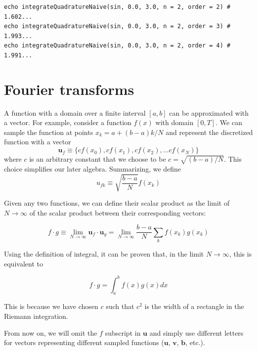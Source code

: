 \documentclass[justified, sixbynine]{tufte-book}
\theoremstyle{plain}%
\newtheorem * {corollary}{Corollary}
\theoremstyle{definition}
\theoremstyle{remark}
\newtheorem * {remark}{Remark}
\newtheorem * {note}{Note}
\begin{document}
\begin{fullwidth}
\begin{lstlisting}
echo integrateQuadratureNaive(sin, 0.0, 3.0, n = 2, order = 2) # 1.602...
echo integrateQuadratureNaive(sin, 0.0, 3.0, n = 2, order = 3) # 1.993...
echo integrateQuadratureNaive(sin, 0.0, 3.0, n = 2, order = 4) # 1.991...
\end{lstlisting}

\newpage
\section{Fourier transforms}

A function with a domain over a finite interval $[a, b]$ can be approximated with a vector. For example, consider a function $f(x)$ with domain $[0, T]$. We can sample the function at points $x_k = a+(b-a)k/N$ and represent the discretized function with a vector
\begin{equation}
\mathbf{u}_f \equiv \{cf(x_0), cf(x_1), cf(x_2), ... cf(x_N)\}
\end{equation}
where $c$ is an arbitrary constant that we choose to be $c=\sqrt{(b-a)/N}$. This choice simplifies our later algebra.
Summarizing, we define
\begin{equation}
u_{fk} \equiv \sqrt{\frac{b-a}{N}}f(x_k)
\end{equation}

Given any two functions, we can define their scalar product as the limit of $N\rightarrow\infty$ of the scalar product between their corresponding vectors:

\begin{equation}
f \cdot g \equiv \lim_{N\rightarrow\infty} \mathbf{u}_f \cdot \mathbf{u}_g =
\lim_{N\rightarrow\infty} \frac{b-a}{N} \sum_k f(x_k) g(x_k)
\end{equation}

Using the definition of integral, it can be proven that, in the limit $N\rightarrow\infty$, this is equivalent to

\begin{equation}
f \cdot g = \int_a^b f(x) g(x) dx
\end{equation}

This is because we have chosen $c$ such that $c^2$ is the width of a rectangle in the Riemann integration.

From now on, we will omit the $f$ subscript in $\mathbf{u}$ and simply use different letters for vectors representing different sampled functions ($\mathbf{u}$, $\mathbf{v}$, $\mathbf{b}$, etc.).


\end{fullwidth}
\end{document}
